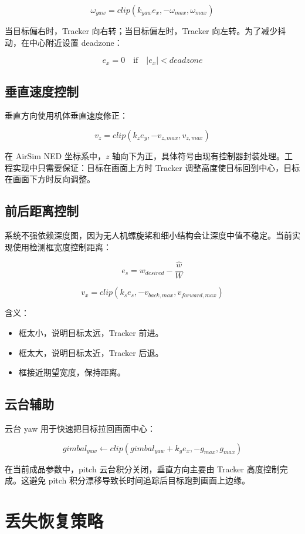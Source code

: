 \documentclass[UTF8,a4paper,11pt]{ctexart}
\begin{document}
\[
\omega_{yaw}=clip(k_{yaw}e_x,-\omega_{max},\omega_{max})
\]

当目标偏右时，Tracker 向右转；当目标偏左时，Tracker 向左转。为了减少抖动，在中心附近设置 deadzone：

\[
e_x=0 \quad \text{if} \quad |e_x|<deadzone
\]

\subsection{垂直速度控制}

垂直方向使用机体垂直速度修正：

\[
v_z=clip(k_z e_y,-v_{z,max},v_{z,max})
\]

在 AirSim NED 坐标系中，$z$ 轴向下为正，具体符号由现有控制器封装处理。工程实现中只需要保证：目标在画面上方时 Tracker 调整高度使目标回到中心，目标在画面下方时反向调整。

\subsection{前后距离控制}

系统不强依赖深度图，因为无人机螺旋桨和细小结构会让深度中值不稳定。当前实现使用检测框宽度控制距离：

\[
e_s=w_{desired}-\frac{\hat{w}}{W}
\]

\[
v_x=clip(k_s e_s,-v_{back,max},v_{forward,max})
\]

含义：

\begin{itemize}
  \item 框太小，说明目标太远，Tracker 前进。
  \item 框太大，说明目标太近，Tracker 后退。
  \item 框接近期望宽度，保持距离。
\end{itemize}

\subsection{云台辅助}

云台 yaw 用于快速把目标拉回画面中心：

\[
gimbal_{yaw} \leftarrow clip(gimbal_{yaw}+k_g e_x,-g_{max},g_{max})
\]

在当前成品参数中，pitch 云台积分关闭，垂直方向主要由 Tracker 高度控制完成。这避免 pitch 积分漂移导致长时间追踪后目标跑到画面上边缘。

\section{丢失恢复策略}
\end{document}
